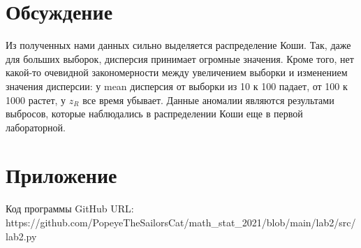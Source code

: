 \documentclass[a4paper]{article}
\begin{document}
\section {Обсуждение} 


Из полученных нами данных сильно выделяется распределение  Коши. Так, даже для больших выборок, дисперсия принимает огромные значения. Кроме того, нет какой-то очевидной закономерности между увеличением выборки и изменением значения дисперсии: у mean дисперсия от выборки из 10 к 100 падает, от 100 к 1000 растет, у $z_R$ все время убывает. Данные аномалии являются результами выбросов, которые наблюдались в распределении Коши еще в первой лабораторной.

\section {Приложение}
\noindent Код программы GitHub URL:\\
\newline https://github.com/PopeyeTheSailorsCat/math\_stat\_2021/blob/main/lab2/src/lab2.py
\end{document}
